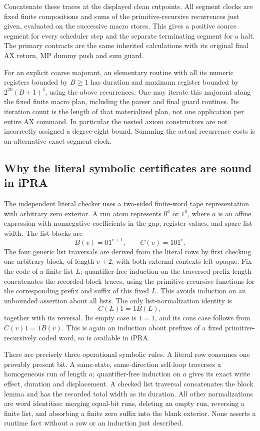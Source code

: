 Concatenate these traces at the displayed clean cutpoints.  All
segment clocks are fixed finite compositions and sums of the
primitive-recursive recurrences just given, evaluated on the
successive macro stores.  This gives a positive source segment
for every scheduler step and the separate terminating segment
for a halt.  The primary contracts are the same inherited
calculations with its original final AX return, MP dummy push
and sum guard.

For an explicit coarse majorant, an elementary routine with all
its numeric registers bounded by $B\geq1$ has duration and maximum
register bounded by $2^{20}(B+1)^4$, using the above recurrences.
One may iterate this majorant along the fixed finite macro plan,
including the parser and final guard routines.  Its iteration
count is the length of that materialized plan, not one application
per entire AX command.  In particular the nested axiom constructors
are not incorrectly assigned a degree-eight bound.  Summing the
actual recurrence costs is an alternative exact segment clock.

\subsection{Why the literal symbolic certificates are sound in iPRA}

The independent literal checker uses a two-sided finite-word tape
representation with arbitrary zero exterior.  A run atom represents
$0^a$ or $1^a$, where $a$ is an affine expression with nonnegative
coefficients in the gap, register values, and spare-list width.
The list blocks are
\[
                  B(v)=01^{v+1},\qquad C(v)=101^v.
\]
The four generic list traversals are derived from the literal rows
by first checking one arbitrary block, of length $v+2$, with both
external contexts left opaque.  Fix the code of a finite list $L$;
quantifier-free induction on the traversed prefix length concatenates
the recorded block traces, using the primitive-recursive functions
for the corresponding prefix and suffix of this fixed $L$.
This avoids induction on an unbounded assertion about all lists.
The only list-normalization
identity is
\[
                   C(L)1=1B(L),
\]
together with its reversal.  Its empty case is $1=1$, and its cons
case follows from $C(v)1=1B(v)$.  This is again an induction about
prefixes of a fixed primitive-recursively coded word, so is available
in iPRA.

There are precisely three operational symbolic rules.  A literal
row consumes one provably present bit.  A same-state,
same-direction self-loop traverses a homogeneous run of length
$a$; quantifier-free induction on $a$ gives its exact write effect,
duration and displacement.  A checked list traversal concatenates
the block lemma and has the recorded total width as its duration.
All other normalizations are word identities: merging equal-bit
runs, deleting an empty run, reversing a finite list, and absorbing
a finite zero suffix into the blank exterior.  None asserts a
runtime fact without a row or an induction just described.

